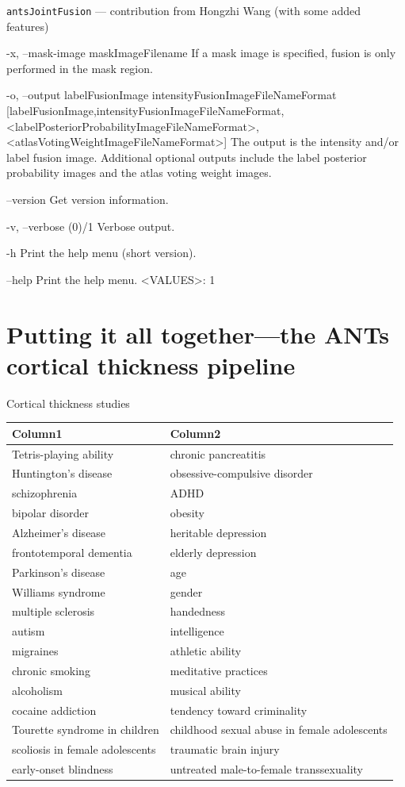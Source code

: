 \documentclass[ignorenonframetext,]{beamer}
\newenvironment{Shaded}{\begin{snugshade}}{\end{snugshade}}
\newcommand{\StringTok}[1]{\textcolor[rgb]{0.31,0.60,0.02}{{#1}}}
\begin{document}
\begin{frame}[fragile]{\texttt{antsJointFusion} --- contribution from
Hongzhi Wang (with some added features)}
\begin{Shaded}
\begin{Highlighting}[]
\StringTok{     -x, --mask-image maskImageFilename}
\StringTok{          If a mask image is specified, fusion is only performed in the mask region.}

\StringTok{     -o, --output labelFusionImage}
\StringTok{                  intensityFusionImageFileNameFormat}
\StringTok{                  [labelFusionImage,intensityFusionImageFileNameFormat,<labelPosteriorProbabilityImageFileNameFormat>,<atlasVotingWeightImageFileNameFormat>]}
\StringTok{          The output is the intensity and/or label fusion image. Additional optional}
\StringTok{          outputs include the label posterior probability images and the atlas voting}
\StringTok{          weight images.}

\StringTok{     --version}
\StringTok{          Get version information.}

\StringTok{     -v, --verbose (0)/1}
\StringTok{          Verbose output.}

\StringTok{     -h}
\StringTok{          Print the help menu (short version).}

\StringTok{     --help}
\StringTok{          Print the help menu.}
\StringTok{          <VALUES>: 1}
\end{Highlighting}
\end{Shaded}

\end{frame}

\section{Putting it all together---the ANTs cortical thickness
pipeline}\label{putting-it-all-togetherthe-ants-cortical-thickness-pipeline}

\begin{frame}{Cortical thickness studies}

\begin{longtable}[c]{@{}ll@{}}
\toprule
Column1 & Column2\tabularnewline
\midrule
\endhead
Tetris-playing ability & chronic pancreatitis\tabularnewline
Huntington's disease & obsessive-compulsive disorder\tabularnewline
schizophrenia & ADHD\tabularnewline
bipolar disorder & obesity\tabularnewline
Alzheimer's disease & heritable depression\tabularnewline
frontotemporal dementia & elderly depression\tabularnewline
Parkinson's disease & age\tabularnewline
Williams syndrome & gender\tabularnewline
multiple sclerosis & handedness\tabularnewline
autism & intelligence\tabularnewline
migraines & athletic ability\tabularnewline
chronic smoking & meditative practices\tabularnewline
alcoholism & musical ability\tabularnewline
cocaine addiction & tendency toward criminality\tabularnewline
Tourette syndrome in children & childhood sexual abuse in female
adolescents\tabularnewline
scoliosis in female adolescents & traumatic brain injury\tabularnewline
early-onset blindness & untreated male-to-female
transsexuality\tabularnewline
\bottomrule
\end{longtable}

\end{frame}
\end{document}
